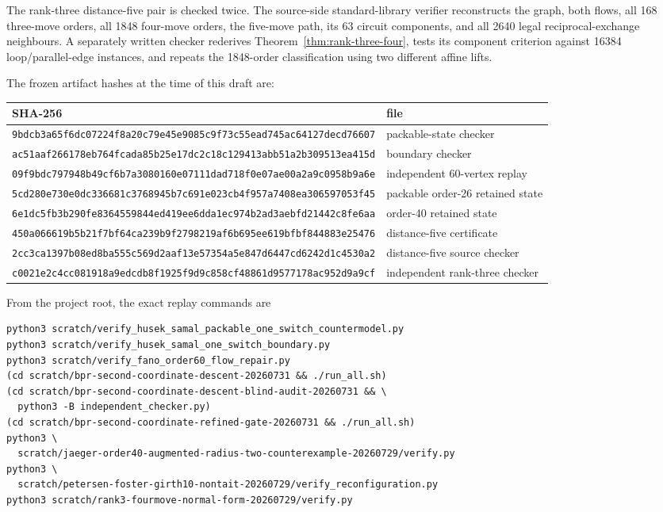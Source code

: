\documentclass[11pt]{article}
\theoremstyle{definition}
\theoremstyle{remark}
\numberwithin{equation}{section}
\begin{document}
The rank-three distance-five pair is checked twice.  The source-side
standard-library verifier reconstructs the graph, both flows, all 168
three-move orders, all 1848 four-move orders, the five-move path, its
63 circuit components, and all 2640 legal reciprocal-exchange
neighbours.  A separately written checker rederives
Theorem~\ref{thm:rank-three-four}, tests its component criterion against
16384 loop/parallel-edge instances, and repeats the 1848-order
classification using two different affine lifts.

The frozen artifact hashes at the time of this draft are:
\begin{center}
\scriptsize
\begin{tabular}{@{}p{}p{}@{}}
\toprule
SHA-256 & file\\
\midrule
\nolinkurl{9bdcb3a65f6dc07224f8a20c79e45e9085c9f73c55ead745ac64127decd76607}
& packable-state checker\\
\nolinkurl{ac51aaf266178eb764fcada85b25e17dc2c18c129413abb51a2b309513ea415d}
& boundary checker\\
\nolinkurl{09f9bdc797948b49cf6b7a3080160e07111dad718f0e07ae00a2a9c0958b9a6e}
& independent 60-vertex replay\\
\nolinkurl{5cd280e730e0dc336681c3768945b7c691e023cb4f957a7408ea306597053f45}
& packable order-26 retained state\\
\nolinkurl{6e1dc5fb3b290fe8364559844ed419ee6dda1ec974b2ad3aebfd21442c8fe6aa}
& order-40 retained state\\
\nolinkurl{450a066619b5b21f7bf64ca239b9f2798219af6b695ee619bfbf844883e25476}
& distance-five certificate\\
\nolinkurl{2cc3ca1397b08ed8ba555c569d2aaf13e57354a5e847d6447cd6242d1c4530a2}
& distance-five source checker\\
\nolinkurl{c0021e2c4cc081918a9edcdb8f1925f9d9c858cf48861d9577178ac952d9a9cf}
& independent rank-three checker\\
\bottomrule
\end{tabular}
\end{center}

From the project root, the exact replay commands are
\begin{verbatim}
python3 scratch/verify_husek_samal_packable_one_switch_countermodel.py
python3 scratch/verify_husek_samal_one_switch_boundary.py
python3 scratch/verify_fano_order60_flow_repair.py
(cd scratch/bpr-second-coordinate-descent-20260731 && ./run_all.sh)
(cd scratch/bpr-second-coordinate-descent-blind-audit-20260731 && \
  python3 -B independent_checker.py)
(cd scratch/bpr-second-coordinate-refined-gate-20260731 && ./run_all.sh)
python3 \
  scratch/jaeger-order40-augmented-radius-two-counterexample-20260729/verify.py
python3 \
  scratch/petersen-foster-girth10-nontait-20260729/verify_reconfiguration.py
python3 scratch/rank3-fourmove-normal-form-20260729/verify.py
\end{verbatim}
\end{document}
